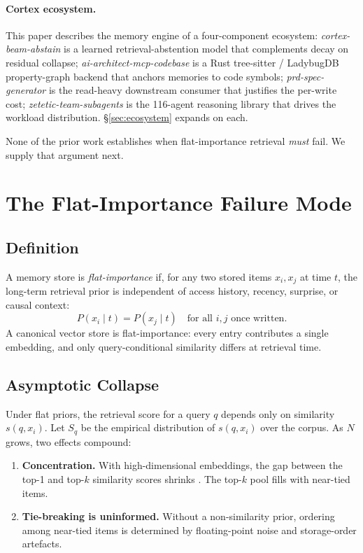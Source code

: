\documentclass[11pt]{article}
\begin{document}
\paragraph{Cortex ecosystem.}
This paper describes the memory engine of a four-component
ecosystem: \emph{cortex-beam-abstain} \citep{Deust2026a} is a
learned retrieval-abstention model that complements decay on
residual collapse; \emph{ai-architect-mcp-codebase} \citep{Deust2026b} is
a Rust tree-sitter / LadybugDB property-graph backend that anchors
memories to code symbols; \emph{prd-spec-generator}
\citep{Deust2026c} is the read-heavy downstream consumer that
justifies the per-write cost; \emph{zetetic-team-subagents}
\citep{Deust2026d} is the 116-agent reasoning library that drives
the workload distribution.  \S\ref{sec:ecosystem} expands on each.

None of the prior work establishes when flat-importance retrieval
\emph{must} fail.  We supply that argument next.

\section{The Flat-Importance Failure Mode}
\label{sec:flat-failure}

\subsection{Definition}
\label{sec:flat-def}

A memory store is \emph{flat-importance} if, for any two stored
items $x_i, x_j$ at time $t$, the long-term retrieval prior is
independent of access history, recency, surprise, or causal context:
\begin{equation}
P(x_i \mid t) = P(x_j \mid t) \quad \text{for all } i, j \text{ once written.}
\label{eq:flat-prior}
\end{equation}
A canonical vector store is flat-importance: every entry contributes
a single embedding, and only query-conditional similarity differs
at retrieval time.

\subsection{Asymptotic Collapse}
\label{sec:flat-collapse}

Under flat priors, the retrieval score for a query $q$ depends only
on similarity $s(q, x_i)$.  Let $S_q$ be the empirical distribution
of $s(q, x_i)$ over the corpus.  As $N$ grows, two effects compound:
\begin{enumerate}
  \item \textbf{Concentration.}  With high-dimensional embeddings,
        the gap between the top-1 and top-$k$ similarity scores
        shrinks \citep{Aggarwal2001,Beyer1999}.  The top-$k$ pool
        fills with near-tied items.
  \item \textbf{Tie-breaking is uninformed.}  Without a
        non-similarity prior, ordering among near-tied items is
        determined by floating-point noise and storage-order
        artefacts.
\end{enumerate}
\end{document}

